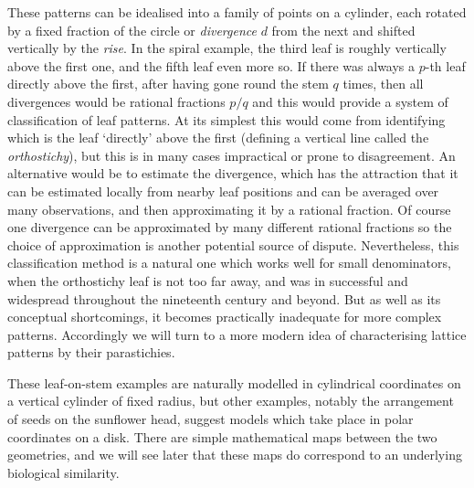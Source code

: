 These patterns can be idealised into a family of points on a cylinder, each rotated by a fixed fraction of the circle or \emph{divergence} $d$ from the next and shifted vertically by the \emph{rise}. 
In the spiral example, the third leaf is roughly vertically above the first one, and the fifth leaf even more so. 
If there was always a $p$-th leaf directly above the first, after having gone round the stem $q$ times, then all divergences would be rational fractions $p/q$  and this would provide a system of classification of leaf patterns. At its simplest this would come from identifying which is the leaf `directly' above the first (defining a vertical line called the \emph{orthostichy}), but this is in many cases impractical or 
prone to disagreement. An alternative would be to estimate the divergence, which has the attraction that it can be estimated locally from nearby leaf positions and can be averaged over many observations, and 
then approximating it by a rational fraction. Of course one divergence can be approximated by many different rational fractions so the choice of approximation is another potential source of dispute.
Nevertheless, this classification method is a natural one which works well for small denominators,  when the orthostichy leaf is not too far away, and was in successful and widespread throughout the nineteenth century and beyond. But as well as its conceptual shortcomings, it becomes practically inadequate for more complex patterns. Accordingly we will turn to a more modern idea of characterising lattice patterns by their parastichies.

These leaf-on-stem examples are naturally modelled in cylindrical coordinates on a vertical cylinder of fixed radius, but other examples, notably the arrangement of seeds on the sunflower head, suggest models which take place in polar coordinates on a disk. There are simple mathematical maps between the two geometries, and we will see later that these maps do correspond to an underlying biological similarity.%



